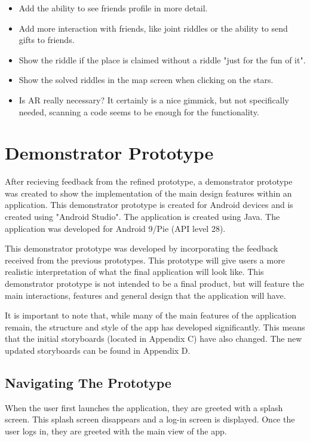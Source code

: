 \documentclass[10pt,twocolumn]{article} %
\begin{document}
\begin{itemize}[noitemsep]
  \item Add the ability to see friends profile in more detail.
  \item Add more interaction with friends, like joint riddles or the ability to send gifts to friends.
  \item Show the riddle if the place is claimed without a riddle "just for the fun of it".
  \item Show the solved riddles in the map screen when clicking on the stars.
  \item Is AR really necessary? It certainly is a nice gimmick, but not specifically needed, scanning a code seems to be enough for the functionality.
\end{itemize}

\section*{Demonstrator Prototype}

After recieving feedback from the refined prototype, a demonstrator prototype was created to show the implementation of the main design features within an application. This demonstrator prototype is created for Android devices and is created using "Android Studio". The application is created using Java. The application was developed for Android 9/Pie (API level 28).

This demonstrator prototype was developed by incorporating the feedback received from the previous prototypes. This prototype will give users a more realistic interpretation of what the final application will look like. This demonstrator prototype is not intended to be a final product, but will feature the main interactions, features and general design that the application will have.

It is important to note that, while many of the main features of the application remain, the structure and style of the app has developed significantly. This means that the initial storyboards (located in Appendix C) have also changed. The new updated storyboards can be found in Appendix D. 
\subsection*{Navigating The Prototype}
When the user first launches the application, they are greeted with a splash screen. This splash screen disappears and a log-in screen is displayed. Once the user logs in, they are greeted with the main view of the app.
\end{document}
